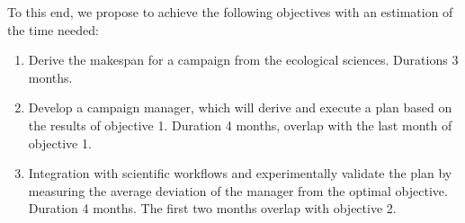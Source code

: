To this end, we propose to achieve the following objectives with an estimation 
of the time needed:
\begin{enumerate}
    \item Derive the makespan for a campaign from the ecological sciences. 
    Durations 3 months.
    \item Develop a campaign manager, which will derive and execute a plan 
    based on the results of objective 1. Duration 4 months, overlap with the 
    last month of objective 1.
    \item Integration with scientific workflows and experimentally validate the 
    plan by measuring the average deviation of the manager from the optimal 
    objective. Duration 4 months. The first two months overlap with objective 2.
\end{enumerate}


